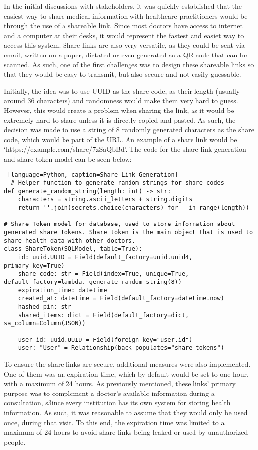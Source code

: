 In the initial discussions with stakeholders, it was quickly established that the easiest way to share medical information with healthcare practitioners would be through the use of a shareable link. Since most doctors have access to internet and a computer at their desks, it would represent the fastest and easiet way to access this system. Share links are also very versatile, as they could be sent via email, written on a paper, dictated or even generated as a QR code that can be scanned. As such, one of the first challenges was to design these shareable links so that they would be easy to transmit, but also secure and not easily guessable.

Initially, the idea was to use UUID as the share code, as their length (usually around 36 characters) and randomness would make them very hard to guess. However, this would create a problem when sharing the link, as it would be extremely hard to share unless it is directly copied and pasted. As such, the decision was made to use a string of 8 randomly generated characters as the share code, which would be part of the URL. An example of a share link would be `https://example.com/share/7zSaQbBd'. The code for the share link generation and share token model can be seen below:

\begin{lstlisting} [language=Python, caption=Share Link Generation]
  # Helper function to generate random strings for share codes
def generate_random_string(length: int) -> str:
    characters = string.ascii_letters + string.digits
    return ''.join(secrets.choice(characters) for _ in range(length))

# Share Token model for database, used to store information about generated share tokens. Share token is the main object that is used to share health data with other doctors.
class ShareToken(SQLModel, table=True):
    id: uuid.UUID = Field(default_factory=uuid.uuid4, primary_key=True)
    share_code: str = Field(index=True, unique=True, default_factory=lambda: generate_random_string(8))
    expiration_time: datetime
    created_at: datetime = Field(default_factory=datetime.now)
    hashed_pin: str
    shared_items: dict = Field(default_factory=dict, sa_column=Column(JSON))
   
    user_id: uuid.UUID = Field(foreign_key="user.id")
    user: "User" = Relationship(back_populates="share_tokens")
\end{lstlisting}

To ensure the share links are secure, additional measures were also implemented. One of them was an expiration time, which by default would be set to one hour, with a maximum of 24 hours. As previously mentioned, these links' primary purpose was to complement a doctor's available information during a consultation, s3ince every institution has its own system for storing health information. As such, it was reasonable to assume that they would only be used once, during that visit. To this end, the expiration time was limited to a maximum of 24 hours to avoid share links being leaked or used by unauthorized people.

